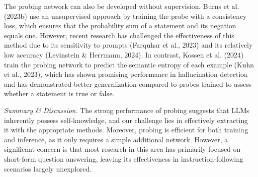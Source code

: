 The probing network can also be developed without supervision. Burns et al. (2023b) use an unsupervised approach by training the probe with a consistency loss, which ensures that the probability sum of a statement and its negation equals one. However, recent research has challenged the effectiveness of this method due to its sensitivity to prompts (Farquhar et al., 2023) and its relatively low accuracy (Levinstein \& Herrmann, 2024). In contrast, Kossen et al. (2024) train the probing network to predict the semantic entropy of each example (Kuhn et al., 2023), which has shown promising performance in hallucination detection and has demonstrated better generalization compared to probes trained to assess whether a statement is true or false.

\emph{Summary \& Discussion.} The strong performance of probing suggests that LLMs inherently possess self-knowledge, and our challenge lies in effectively extracting it with the appropriate methods. Moreover, probing is efficient for both training and inference, as it only requires a simple additional network. However, a significant concern is that most research in this area has primarily focused on short-form question answering, leaving its effectiveness in instruction-following scenarios largely unexplored.
